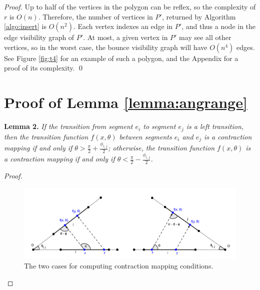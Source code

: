 \documentclass[]{styles/svproc}  %
\begin{document}
\begin{appendix}
\begin{proof}
Up to half of the vertices in the polygon can be reflex, so the complexity of
$r$ is $O(n)$. Therefore, the number of vertices in $P'$, returned by Algorithm
\ref{algo:insert} is $O(n^2)$. Each vertex indexes an edge in $P'$, and
thus a node in the edge visibility graph of $P'$. At most, a given vertex in $P'$ may see all other vertices, so in the worst
case, the bounce visibility graph will have $O(n^4)$ edges. See Figure
\ref{fig:t4} for an example of such a polygon, and the Appendix for a proof of
its complexity.
\qed

\end{proof}
\section{Proof of Lemma \ref{lemma:angrange}}

\textbf{Lemma 2.} {\em
If the transition from segment $e_i$ to segment $e_j$ is a left transition, then the
transition function $f(x, \theta)$ between segments $e_i$ and $e_j$ is a contraction
mapping if and only if $\theta > \frac{\pi}{2}+\frac{\phi_{i, j}}{2}$;
otherwise, the transition function $f(x, \theta)$ is a contraction mapping if
and only if $\theta < \frac{\pi}{2}-\frac{\phi_{i, j}}{2}$.}

\begin{proof}

\begin{figure}
    \includegraphics[width=1\linewidth]{figures/contraction_map_cond.png}
    \centering
    \caption{The two cases for computing contraction mapping conditions. \label{fig:cont_map}}
    \centering
\end{figure}


\end{proof}
\end{appendix}
\end{document}
